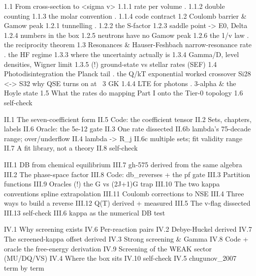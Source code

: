 \begin{srclisting}
1.1  From cross-section to <sigma v>  1.1.1 rate per volume . 1.1.2 double counting
                                      1.1.3 the molar convention . 1.1.4 code contract
1.2  Coulomb barrier & Gamow peak     1.2.1 tunnelling . 1.2.2 the S-factor
                                      1.2.3 saddle point -> E0, Delta
                                      1.2.4 numbers in the box
                                      1.2.5 neutrons have no Gamow peak
                                      1.2.6 the 1/v law . the reciprocity theorem
1.3  Resonances & Hauser-Feshbach     narrow-resonance rate . the HF regime
                                      1.3.3 where the uncertainty actually is
                                      1.3.4 Gamma/D, level densities, Wigner limit
                                      1.3.5 (!) ground-state vs stellar rates (SEF)
1.4  Photodisintegration              the Planck tail . the Q/kT exponential
                                      worked crossover Si28 <-> S32
                                      why QSE turns on at ~3 GK
                                      1.4.4 LTE for photons . 3-alpha & the Hoyle state
1.5  What the rates do                mapping Part I onto the Tier-0 topology
1.6  self-check

II.1 The seven-coefficient form    II.5  Code: the coefficient tensor
II.2 Sets, chapters, labels        II.6  Oracle: the 5e-12 gate
II.3 One rate dissected            II.6b lambda's 75-decade range; over/underflow
II.4 lambda -> R_j                 II.6c multiple sets; fit validity range
                                   II.7  A fit library, not a theory
                                   II.8  self-check

III.1 DB from chemical equilibrium III.7  gh-575 derived from the same algebra
III.2 The phase-space factor       III.8  Code: db_reverses + the pf gate
III.3 Partition functions          III.9  Oracles
      (!) the G vs (2J+1)G trap    III.10 The two kappa conventions
      spline extrapolation         III.11 Coulomb corrections to NSE
III.4 Three ways to build a reverse III.12 Q(T) derived + measured
III.5 The v-flag dissected         III.13 self-check
III.6 kappa as the numerical DB test

IV.1 Why screening exists          IV.6  Per-reaction pairs
IV.2 Debye-Huckel derived          IV.7  The screened-kappa offset derived
IV.3 Strong screening & Gamma      IV.8  Code + oracle
      the free-energy derivation   IV.9  Screening of the WEAK sector (MU/DQ/VS)
IV.4 Where the box sits            IV.10 self-check
IV.5 chugunov_2007 term by term


\end{srclisting}
